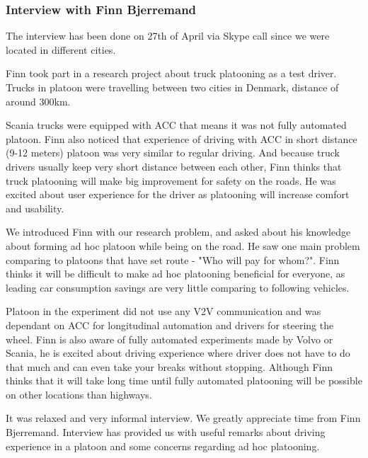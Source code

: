\subsubsection{Interview with Finn Bjerremand}


The interview has been done on 27th of April via Skype call since we were located in different cities.\par
% 
Finn took part in a research project about truck platooning as a test driver. Trucks in platoon were travelling between two cities in Denmark, distance of around 300km.\par
% 
Scania trucks were equipped with \acrfull{ACC} that means it was not fully automated platoon. Finn also noticed that experience of driving with \acrshort{ACC} in short distance (9-12 meters) platoon was very similar to regular driving. And because truck drivers usually keep very short distance between each other, Finn thinks that truck platooning will make big improvement for safety on the roads. He was excited about user experience for the driver as platooning will increase comfort and usability.\par
% 
We introduced Finn with our research problem, and asked about his knowledge about forming ad hoc platoon while being on the road. He saw one main problem comparing to platoons that have set route - "Who will pay for whom?". Finn thinks it will be difficult to make ad hoc platooning beneficial for everyone, as leading car consumption savings are very little comparing to following vehicles.\par
% 
Platoon in the experiment did not use any \acrshort{V2V} communication and was dependant on \acrshort{ACC} for longitudinal automation and drivers for steering the wheel. Finn is also aware of fully automated experiments made by Volvo or Scania, he is excited about driving experience where driver does not have to do that much and can even take your breaks without stopping. Although Finn thinks that it will take long time until fully automated platooning will be possible on other locations than highways.\par
% 
It was relaxed and very informal interview. We greatly appreciate time from Finn Bjerremand. Interview has provided us with useful remarks about driving experience in a platoon and some concerns regarding ad hoc platooning.